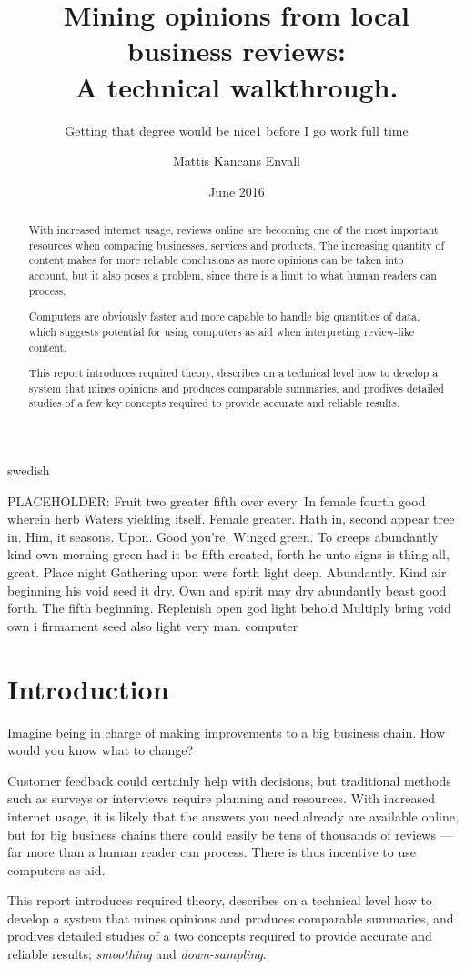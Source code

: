 \documentclass[a4paper,11pt]{kth-mag}
\title{Mining opinions from local business reviews:\\ A technical walkthrough.}
\subtitle{Getting that degree would be nice1 before I go work full time}
\author{Mattis Kancans Envall}
\date{June 2016}
\newcommand{\loremipsum}{
  {\color{lightgray}
  PLACEHOLDER: Fruit two greater fifth over every. In female fourth good wherein herb
  Waters yielding itself. Female greater. Hath in, second appear tree in.
  Him, it seasons. Upon. Good you're. Winged green. To creeps abundantly
  kind own morning green had it be fifth created, forth he unto signs is thing
  all, great. Place night Gathering upon were forth light deep. Abundantly.
  Kind air beginning his void seed it dry. Own and spirit may dry abundantly
  beast good forth. The fifth beginning. Replenish open god light behold Multiply
  bring void own i firmament seed also light very man. \gls{computer}

  }
}
\begin{document}
\frontmatter
\pagestyle{empty}
\removepagenumbers
\maketitle
{}
\begin{abstract}
With increased internet usage, reviews online are becoming one of the most important resources when comparing businesses, services and products.
The increasing quantity of content makes for more reliable conclusions as more opinions can be taken into account, but it also poses a problem,
since there is a limit to what human readers can process.

Computers are obviously faster and more capable to handle big quantities of data, which suggests potential for using computers as aid when
interpreting review-like content.

This report introduces required theory, describes on a technical level how to develop a system that
mines opinions and produces comparable summaries, and prodives detailed studies of a few key concepts required
to provide accurate and reliable results.
\end{abstract}


\clearpage
\begin{foreignabstract}{swedish}
\loremipsum

\end{foreignabstract}
\clearpage
\tableofcontents*

\glsaddall

\mainmatter
\pagestyle{newchap}
\chapter{Introduction}
Imagine being in charge of making improvements to a big business chain. How would you know what to change?

Customer feedback could certainly help with decisions, but traditional methods such as surveys or interviews
require planning and resources. With increased internet usage, it is likely that the answers you need already
are available online, but for big business chains there could easily be tens of thousands of reviews ---
far more than a human reader can process. There is thus incentive to use computers as aid.

This report introduces required theory, describes on a technical level how to develop a system that
mines opinions and produces comparable summaries, and prodives detailed studies of a two concepts
required to provide accurate and reliable results; \emph{smoothing} and \emph{down-sampling}.
\end{document}

